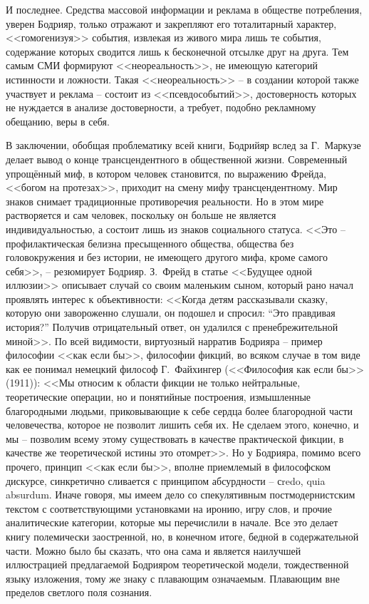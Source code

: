 И последнее. Средства массовой информации и реклама в обществе потребления,
уверен Бодрияр, только отражают и закрепляют его тоталитарный характер, <<гомогенизуя>>
события, извлекая из живого мира лишь те события, содержание которых сводится лишь
к бесконечной отсылке друг на друга. Тем самым СМИ формируют <<неореальность>>,
не имеющую категорий истинности и ложности. Такая <<неореальность>> -- в создании
которой также участвует и реклама -- состоит из <<псевдособытий>>, достоверность
которых не нуждается в анализе достоверности, а требует, подобно рекламному обещанию,
веры в себя. \autocite[][150--166]{bodriyar_society}

В заключении, обобщая проблематику всей книги, Бодрийяр вслед за Г.~Маркузе делает
вывод о конце трансцендентного в общественной жизни. Современный упрощённый миф,
в котором человек становится, по выражению Фрейда, <<богом на протезах>>,
приходит на смену мифу трансцендентному. Мир знаков снимает традиционные противоречия
реальности. Но в этом мире растворяется и сам человек, поскольку он больше не
является индивидуальностью, а состоит лишь из знаков социального статуса.
<<Это -- профилактическая белизна пресыщенного общества, общества без головокружения
и без истории, не имеющего другого мифа, кроме самого себя>>, -- резюмирует Бодрияр.
\autocite[][245]{bodriyar_society}\autocite{kara2000}
З.~Фрейд в статье <<Будущее одной иллюзии>> описывает случай со своим маленьким
сыном, который рано начал проявлять интерес к объективности: <<Когда детям
рассказывали сказку, которую они завороженно слушали, он подошел и спросил:
``Это правдивая история?'' Получив отрицательный ответ, он удалился с пренебрежительной
миной>>.\autocite[][40]{freud1992} По всей видимости, виртуозный нарратив Бодрияра --
пример философии <<как если бы>>, философии фикций, во всяком случае в том виде
как ее понимал немецкий философ Г.~Файхингер (<<Философия как если бы>> (1911)):
<<Мы относим к области фикции не только нейтральные, теоретические операции, но
и понятийные построения, измышленные благородными людьми, приковывающие к себе
сердца более благородной части человечества, которое не позволит лишить себя их.
Не сделаем этого, конечно, и мы -- позволим всему этому существовать в качестве
практической фикции, в качестве же теоретической истины это отомрет>>.\autocite{freud1992}
Но у Бодрияра, помимо всего прочего, принцип <<как если бы>>,
вполне приемлемый в философском дискурсе, синкретично сливается с принципом
абсурдности -- сredo, quia absurdum. Иначе говоря, мы имеем дело со спекулятивным
постмодернистским текстом с соответствующими установками на иронию,
игру слов, и прочие аналитические категории, которые мы перечислили в начале.
Все это делает книгу полемически заостренной, но, в конечном итоге, бедной в
содержательной части. Можно было бы сказать, что она сама и является наилучшей
иллюстрацией предлагаемой Бодрияром теоретической модели, тождественной языку
изложения, тому же знаку с плавающим означаемым. Плавающим вне пределов светлого
поля сознания.

